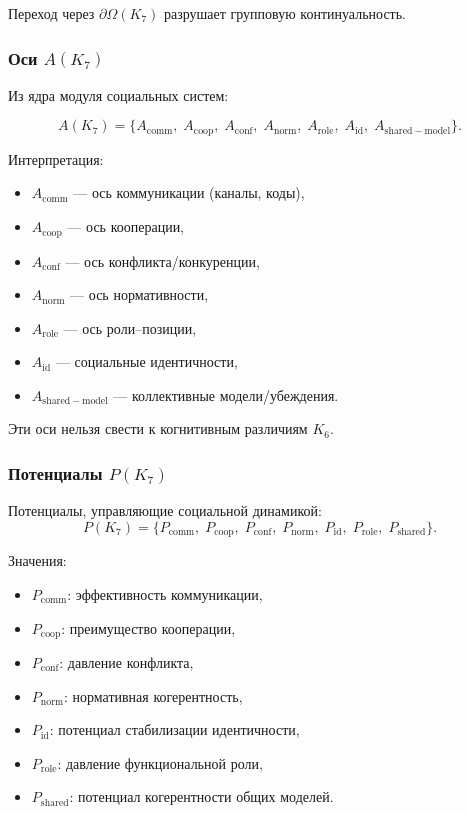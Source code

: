 Переход через $\partial\Omega(K_7)$ разрушает групповую континуальность.

\subsubsection{Оси \texorpdfstring{$A(K_7)$}{A(K_7)}}

Из ядра модуля социальных систем:

\[
A(K_7)=
\{
A_{\mathrm{comm}},\;
A_{\mathrm{coop}},\;
A_{\mathrm{conf}},\;
A_{\mathrm{norm}},\;
A_{\mathrm{role}},\;
A_{\mathrm{id}},\;
A_{\mathrm{shared-model}}
\}.
\]

Интерпретация:
\begin{itemize}
    \item $A_{\mathrm{comm}}$ — ось коммуникации (каналы, коды),
    \item $A_{\mathrm{coop}}$ — ось кооперации,
    \item $A_{\mathrm{conf}}$ — ось конфликта/конкуренции,
    \item $A_{\mathrm{norm}}$ — ось нормативности,
    \item $A_{\mathrm{role}}$ — ось роли–позиции,
    \item $A_{\mathrm{id}}$ — социальные идентичности,
    \item $A_{\mathrm{shared-model}}$ — коллективные модели/убеждения.
\end{itemize}

Эти оси нельзя свести к когнитивным различиям $K_6$.

\subsubsection{Потенциалы \texorpdfstring{$P(K_7)$}{P(K_7)}}

Потенциалы, управляющие социальной динамикой:
\[
P(K_7)=
\{
P_{\mathrm{comm}},\;
P_{\mathrm{coop}},\;
P_{\mathrm{conf}},\;
P_{\mathrm{norm}},\;
P_{\mathrm{id}},\;
P_{\mathrm{role}},\;
P_{\mathrm{shared}}
\}.
\]

Значения:
\begin{itemize}
    \item $P_{\mathrm{comm}}$: эффективность коммуникации,
    \item $P_{\mathrm{coop}}$: преимущество кооперации,
    \item $P_{\mathrm{conf}}$: давление конфликта,
    \item $P_{\mathrm{norm}}$: нормативная когерентность,
    \item $P_{\mathrm{id}}$: потенциал стабилизации идентичности,
    \item $P_{\mathrm{role}}$: давление функциональной роли,
    \item $P_{\mathrm{shared}}$: потенциал когерентности общих моделей.
\end{itemize}

